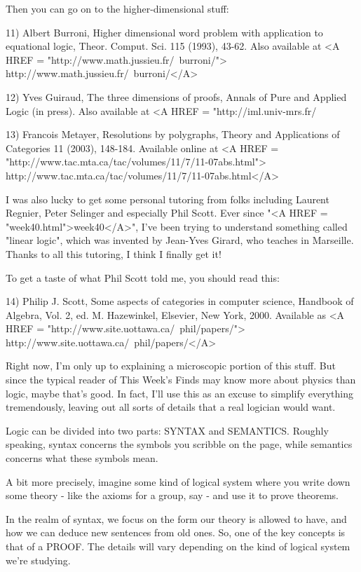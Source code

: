 Then you can go on to the higher-dimensional stuff:

11) Albert Burroni, Higher dimensional word problem with application 
to equational logic, Theor. Comput. Sci. 115 (1993), 43-62.
Also available at <A HREF = "http://www.math.jussieu.fr/~burroni/">
http://www.math.jussieu.fr/~burroni/</A>

12) Yves Guiraud, The three dimensions of proofs, Annals of Pure
and Applied Logic (in press).  Also available at
<A HREF = "http://iml.univ-mrs.fr/%

13) Francois Metayer, Resolutions by polygraphs, Theory and 
Applications of Categories 11 (2003), 148-184.  Available online
at 
<A HREF = "http://www.tac.mta.ca/tac/volumes/11/7/11-07abs.html">
http://www.tac.mta.ca/tac/volumes/11/7/11-07abs.html</A>

I was also lucky to get some personal tutoring from folks including
Laurent Regnier, Peter Selinger and especially Phil Scott.  Ever since
"<A HREF = "week40.html">week40</A>", I've been trying to understand something called "linear logic",
which was invented by Jean-Yves Girard, who teaches in Marseille.  
Thanks to all this tutoring, I think I finally get it!   

To get a taste of what Phil Scott told me, you should read this:

14) Philip J. Scott, Some aspects of categories in computer science,
Handbook of Algebra, Vol. 2, ed. M. Hazewinkel, Elsevier, New York, 2000.
Available as <A HREF = "http://www.site.uottawa.ca/~phil/papers/">
http://www.site.uottawa.ca/~phil/papers/</A>

Right now, I'm only up to explaining a microscopic portion of this 
stuff.  But since the typical reader of This Week's Finds may know more
about physics than logic, maybe that's good.  In fact, I'll use this
as an excuse to simplify everything tremendously, leaving out all sorts
of details that a real logician would want.

Logic can be divided into two parts: SYNTAX and SEMANTICS.  Roughly
speaking, syntax concerns the symbols you scribble on the page, 
while semantics concerns what these symbols mean.

A bit more precisely, imagine some kind of logical system where you 
write down some theory - like the axioms for a group, say - and use
it to prove theorems.  

In the realm of syntax, we focus on the form our theory is allowed 
to have, and how we can deduce new sentences from old ones.  So, one 
of the key concepts is that of a PROOF.  The details will vary depending 
on the kind of logical system we're studying.  

